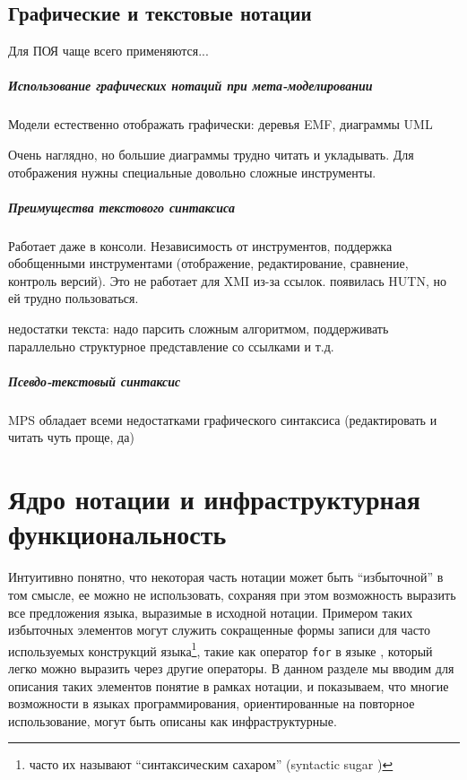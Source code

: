 \section{Графические и текстовые нотации}

Для ПОЯ чаще всего применяются...

\paragraph*{Использование графических нотаций при мета-моделировании}

Модели естественно отображать графически: деревья EMF, диаграммы UML

Очень наглядно, но большие диаграммы трудно читать и укладывать.
Для отображения нужны специальные довольно сложные инструменты.

\paragraph*{Преимущества текстового синтаксиса}

Работает даже в консоли. Независимость от инструментов, поддержка обобщенными инструментами (отображение, редактирование, сравнение, контроль версий). Это не работает для XMI из-за ссылок. появилась HUTN, но ей трудно пользоваться.

недостатки текста: надо парсить сложным алгоритмом, поддерживать параллельно структурное представление со ссылками и т.д.

\paragraph*{Псевдо-текстовый синтаксис}

MPS обладает всеми недостатками графического синтаксиса (редактировать и читать чуть проще, да)

\chapter{Ядро нотации и инфраструктурная функциональность}

Интуитивно понятно, что некоторая часть нотации может быть ``избыточной'' в том смысле, ее можно не использовать, сохраняя при этом возможность выразить все предложения языка, выразимые в исходной нотации. Примером таких избыточных элементов могут служить сокращенные формы записи для часто используемых конструкций языка\footnote{часто их называют ``синтаксическим сахаром'' (syntactic sugar \cite{???})}, такие как оператор \texttt{for} в языке  \cite{???}, который легко можно выразить через другие операторы. В данном разделе мы вводим для описания таких элементов понятие  в рамках нотации, и показываем, что многие возможности в языках программирования, ориентированные на повторное использование, могут быть описаны как инфраструктурные.

